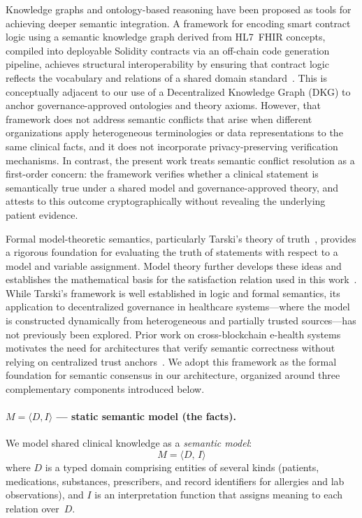 \documentclass[journal]{IEEEtran}
\begin{document}
Knowledge graphs and ontology-based reasoning have been proposed as
tools for achieving deeper semantic integration. A framework for
encoding smart contract logic using a semantic knowledge graph derived
from HL7~FHIR concepts, compiled into deployable Solidity contracts
via an off-chain code generation pipeline, achieves structural
interoperability by ensuring that contract logic reflects the
vocabulary and relations of a shared domain
standard~\cite{van2025semantic}. This is conceptually adjacent to our
use of a Decentralized Knowledge Graph (DKG) to anchor
governance-approved ontologies and theory axioms. However, that
framework does not address semantic conflicts that arise when different
organizations apply heterogeneous terminologies or data representations
to the same clinical facts, and it does not
incorporate privacy-preserving verification mechanisms. In contrast,
the present work treats semantic conflict resolution as a first-order
concern: the framework verifies whether a clinical statement is
semantically true under a shared model and governance-approved theory,
and attests to this outcome cryptographically without revealing the
underlying patient evidence.

Formal model-theoretic semantics, particularly Tarski's theory of
truth~\cite{tarski1944semantic}, provides a rigorous foundation for
evaluating the truth of statements with respect to a model and
variable assignment. Model theory further develops these ideas and
establishes the mathematical basis for the satisfaction relation used
in this work~\cite{hodges1997shorter}. While Tarski's framework is
well established in logic and formal semantics, its application to
decentralized governance in healthcare systems---where the model is
constructed dynamically from heterogeneous and partially trusted
sources---has not previously been explored. Prior work on
cross-blockchain e-health systems motivates the need for architectures
that verify semantic correctness without relying on centralized trust
anchors~\cite{mfssia}. We adopt this framework as the formal
foundation for semantic consensus in our architecture, organized
around three complementary components introduced below.

\paragraph{$M = \langle D, I \rangle$ — static semantic model
           (the facts).}

We model shared clinical knowledge as a \emph{semantic model}:
\begin{equation}\label{eq:model}
  M = \langle D,\, I \rangle
\end{equation}
where $D$ is a typed domain comprising entities of several kinds
(patients, medications, substances, prescribers, and record
identifiers for allergies and lab observations), and $I$ is an 
interpretation function that assigns meaning to each relation 
over~$D$.
\end{document}
